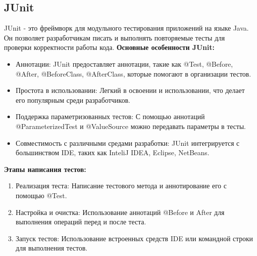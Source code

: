 \documentclass[areasetadvanced]{scrartcl}
\begin{document}
\subsection{JUnit}
JUnit - это фреймворк для модульного тестирования приложений на языке Java. Он позволяет разработчикам писать и выполнять повторяемые тесты для проверки корректности работы кода.
\textbf{Основные особенности JUnit:}
\begin{itemize}
	\item Аннотации: JUnit предоставляет аннотации, такие как @Test, @Before, @After, @BeforeClass, @AfterClass, которые помогают в организации тестов.
	\item Простота в использовании: Легкий в освоении и использовании, что делает его популярным среди разработчиков.
	\item Поддержка параметризованных тестов: С помощью аннотаций @ParameterizedTest и @ValueSource можно передавать параметры в тесты.
	\item Совместимость с различными средами разработки: JUnit интегрируется с большинством IDE, таких как InteliJ IDEA, Eclipse, NetBeans.
\end{itemize}
\textbf{Этапы написания тестов:}
\begin{enumerate}
	\item Реализация теста: Написание тестового метода и аннотирование его с помощью @Test.
	\item Настройка и очистка: Использование аннотаций @Before и After для выполнения операций перед и после теста.
	\item Запуск тестов: Использование встроенных средств IDE или командной строки для выполнения тестов.
\end{enumerate}
\end{document}
